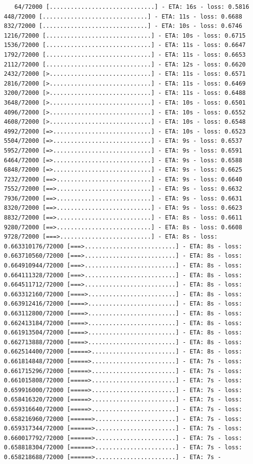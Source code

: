 \documentclass[12pt,fleqn]{article}\usepackage{../../common}
\begin{document}
\begin{verbatim}
   64/72000 [..............................] - ETA: 16s - loss: 0.5816  448/72000 [..............................] - ETA: 11s - loss: 0.6688  832/72000 [..............................] - ETA: 10s - loss: 0.6746 1216/72000 [..............................] - ETA: 10s - loss: 0.6715 1536/72000 [..............................] - ETA: 11s - loss: 0.6647 1792/72000 [..............................] - ETA: 11s - loss: 0.6653 2112/72000 [..............................] - ETA: 12s - loss: 0.6620 2432/72000 [>.............................] - ETA: 11s - loss: 0.6571 2816/72000 [>.............................] - ETA: 11s - loss: 0.6469 3200/72000 [>.............................] - ETA: 11s - loss: 0.6488 3648/72000 [>.............................] - ETA: 10s - loss: 0.6501 4096/72000 [>.............................] - ETA: 10s - loss: 0.6552 4608/72000 [>.............................] - ETA: 10s - loss: 0.6548 4992/72000 [=>............................] - ETA: 10s - loss: 0.6523 5504/72000 [=>............................] - ETA: 9s - loss: 0.6537  5952/72000 [=>............................] - ETA: 9s - loss: 0.6591 6464/72000 [=>............................] - ETA: 9s - loss: 0.6588 6848/72000 [=>............................] - ETA: 9s - loss: 0.6625 7232/72000 [==>...........................] - ETA: 9s - loss: 0.6640 7552/72000 [==>...........................] - ETA: 9s - loss: 0.6632 7936/72000 [==>...........................] - ETA: 9s - loss: 0.6631 8320/72000 [==>...........................] - ETA: 9s - loss: 0.6623 8832/72000 [==>...........................] - ETA: 8s - loss: 0.6611 9280/72000 [==>...........................] - ETA: 8s - loss: 0.6608 9728/72000 [===>..........................] - ETA: 8s - loss: 0.663310176/72000 [===>..........................] - ETA: 8s - loss: 0.663710560/72000 [===>..........................] - ETA: 8s - loss: 0.664910944/72000 [===>..........................] - ETA: 8s - loss: 0.664111328/72000 [===>..........................] - ETA: 8s - loss: 0.664511712/72000 [===>..........................] - ETA: 8s - loss: 0.663312160/72000 [====>.........................] - ETA: 8s - loss: 0.663912416/72000 [====>.........................] - ETA: 8s - loss: 0.663112800/72000 [====>.........................] - ETA: 8s - loss: 0.662413184/72000 [====>.........................] - ETA: 8s - loss: 0.661913504/72000 [====>.........................] - ETA: 8s - loss: 0.662713888/72000 [====>.........................] - ETA: 8s - loss: 0.662514400/72000 [=====>........................] - ETA: 8s - loss: 0.661814848/72000 [=====>........................] - ETA: 7s - loss: 0.661715296/72000 [=====>........................] - ETA: 7s - loss: 0.661015808/72000 [=====>........................] - ETA: 7s - loss: 0.659916000/72000 [=====>........................] - ETA: 7s - loss: 0.658416320/72000 [=====>........................] - ETA: 7s - loss: 0.659316640/72000 [=====>........................] - ETA: 7s - loss: 0.658216960/72000 [======>.......................] - ETA: 7s - loss: 0.659317344/72000 [======>.......................] - ETA: 7s - loss: 0.660017792/72000 [======>.......................] - ETA: 7s - loss: 0.658818304/72000 [======>.......................] - ETA: 7s - loss: 0.658218688/72000 [======>.......................] - ETA: 7s - 
\end{verbatim}
\end{document}
